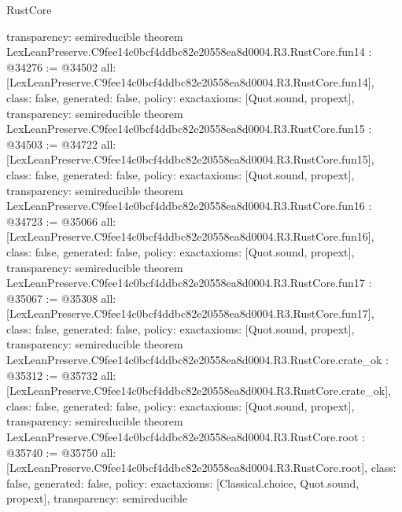 \begin{lexlean}{RustCore}
\begin{coremodule}
{  transparency: semireducible
}
theorem LexLeanPreserve.C9fee14c0bcf4ddbc82e20558ea8d0004.R3.RustCore.fun14 : @34276 := @34502 {
  all: [LexLeanPreserve.C9fee14c0bcf4ddbc82e20558ea8d0004.R3.RustCore.fun14],
  class: false,
  generated: false,
  policy: exact{axioms: [Quot.sound, propext]},
  transparency: semireducible
}
theorem LexLeanPreserve.C9fee14c0bcf4ddbc82e20558ea8d0004.R3.RustCore.fun15 : @34503 := @34722 {
  all: [LexLeanPreserve.C9fee14c0bcf4ddbc82e20558ea8d0004.R3.RustCore.fun15],
  class: false,
  generated: false,
  policy: exact{axioms: [Quot.sound, propext]},
  transparency: semireducible
}
theorem LexLeanPreserve.C9fee14c0bcf4ddbc82e20558ea8d0004.R3.RustCore.fun16 : @34723 := @35066 {
  all: [LexLeanPreserve.C9fee14c0bcf4ddbc82e20558ea8d0004.R3.RustCore.fun16],
  class: false,
  generated: false,
  policy: exact{axioms: [Quot.sound, propext]},
  transparency: semireducible
}
theorem LexLeanPreserve.C9fee14c0bcf4ddbc82e20558ea8d0004.R3.RustCore.fun17 : @35067 := @35308 {
  all: [LexLeanPreserve.C9fee14c0bcf4ddbc82e20558ea8d0004.R3.RustCore.fun17],
  class: false,
  generated: false,
  policy: exact{axioms: [Quot.sound, propext]},
  transparency: semireducible
}
theorem LexLeanPreserve.C9fee14c0bcf4ddbc82e20558ea8d0004.R3.RustCore.crate_ok : @35312 := @35732 {
  all: [LexLeanPreserve.C9fee14c0bcf4ddbc82e20558ea8d0004.R3.RustCore.crate_ok],
  class: false,
  generated: false,
  policy: exact{axioms: [Quot.sound, propext]},
  transparency: semireducible
}
theorem LexLeanPreserve.C9fee14c0bcf4ddbc82e20558ea8d0004.R3.RustCore.root : @35740 := @35750 {
  all: [LexLeanPreserve.C9fee14c0bcf4ddbc82e20558ea8d0004.R3.RustCore.root],
  class: false,
  generated: false,
  policy: exact{axioms: [Classical.choice, Quot.sound, propext]},
  transparency: semireducible
}


\end{coremodule}
\end{lexlean}

